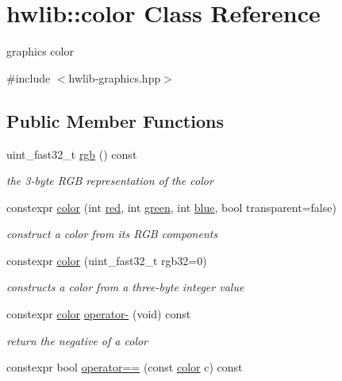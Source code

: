 \hypertarget{classhwlib_1_1color}{}\section{hwlib\+:\+:color Class Reference}
\label{classhwlib_1_1color}


graphics color  




{\ttfamily \#include $<$hwlib-\/graphics.\+hpp$>$}

\subsection*{Public Member Functions}
\begin{DoxyCompactItemize}
\item 
uint\+\_\+fast32\+\_\+t \hyperlink{classhwlib_1_1color_aefae7dad1c11c2d7b2e3928a3e5bfbc6}{rgb} () const 
\begin{DoxyCompactList}\small\item\em the 3-\/byte R\+GB representation of the color \end{DoxyCompactList}\item 
constexpr \hyperlink{classhwlib_1_1color_ab37154ba89eebb42b162c5c660f40ffa}{color} (int \hyperlink{classhwlib_1_1color_a63b0cdaa1bc446995cc8b8724a2ab866}{red}, int \hyperlink{classhwlib_1_1color_ab87f25b9aba71151e056b570e7304c89}{green}, int \hyperlink{classhwlib_1_1color_a9d57edec257fb2626157befb791a6a96}{blue}, bool transparent=false)
\begin{DoxyCompactList}\small\item\em construct a color from its R\+GB components \end{DoxyCompactList}\item 
constexpr \hyperlink{classhwlib_1_1color_aa8d2263ebf5efe2221171217166a669f}{color} (uint\+\_\+fast32\+\_\+t rgb32=0)
\begin{DoxyCompactList}\small\item\em constructs a color from a three-\/byte integer value \end{DoxyCompactList}\item 
constexpr \hyperlink{classhwlib_1_1color}{color} \hyperlink{classhwlib_1_1color_ab3c5a22a3e8f786082f352d2201886fa}{operator-\/} (void) const \hypertarget{classhwlib_1_1color_ab3c5a22a3e8f786082f352d2201886fa}{}\label{classhwlib_1_1color_ab3c5a22a3e8f786082f352d2201886fa}

\begin{DoxyCompactList}\small\item\em return the negative of a color \end{DoxyCompactList}\item 
constexpr bool \hyperlink{classhwlib_1_1color_a226ee50f35e7668d004593c9bf24a643}{operator==} (const \hyperlink{classhwlib_1_1color}{color} c) const \hypertarget{classhwlib_1_1color_a226ee50f35e7668d004593c9bf24a643}{}\label{classhwlib_1_1color_a226ee50f35e7668d004593c9bf24a643}


\end{DoxyCompactItemize}
